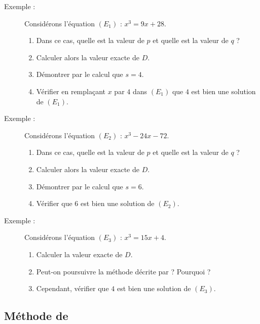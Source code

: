 \documentclass[10pt,openright,twoside,french]{book}
\begin{document}
{\begin{description}
    \item[Exemple  :] Considérons l'équation $(E_1)$ : $x^3 = 9x + 28$.
        \begin{enumerate}
            \item Dans ce cas, quelle est la valeur de $p$ et quelle est la valeur de $q$ ?
            \item Calculer alors la valeur exacte de $D$.
            \item Démontrer par le calcul que $s = 4$.
            \item Vérifier en remplaçant $x$ par $4$ dans $(E_1)$ que $4$ est bien une solution de $(E_1)$.
        \end{enumerate}
    \item[Exemple  :] Considérons l'équation $(E_2)$ : $x^3 - 24x - 72$.
        \begin{enumerate}
            \item Dans ce cas, quelle est la valeur de $p$ et quelle est la valeur de $q$ ?
            \item Calculer alors la valeur exacte de $D$.
            \item Démontrer par le calcul que $s = 6$.
            \item Vérifier que $6$ est bien une solution de $(E_2)$.
        \end{enumerate}
    \item[Exemple  :] Considérons l'équation $(E_3)$ : $x^3 = 15x + 4$.
        \begin{enumerate}
            \item Calculer la valeur exacte de $D$.
            \item Peut-on poursuivre la méthode décrite par \Cardan ? Pourquoi ?
            \item Cependant, vérifier que $4$ est bien une solution de $(E_3)$.
        \end{enumerate}
\end{description}

\subsection*{Méthode de }

}
\end{document}
